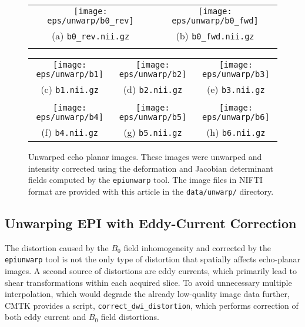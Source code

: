 \documentclass{InsightArticle}
\begin{document}
\begin{figure}[tbp]
\begin{center}
\begin{tabular}{cc}
\texttt{[image: eps/unwarp/b0\_rev]} &
\texttt{[image: eps/unwarp/b0\_fwd]} \\
(a) \texttt{b0\_rev.nii.gz} & (b)  \texttt{b0\_fwd.nii.gz}\\
\\
\end{tabular}
\begin{tabular}{ccc}
\texttt{[image: eps/unwarp/b1]} &
\texttt{[image: eps/unwarp/b2]} &
\texttt{[image: eps/unwarp/b3]} \\
(c) \texttt{b1.nii.gz} & (d) \texttt{b2.nii.gz} & (e) \texttt{b3.nii.gz} \\
\\
\texttt{[image: eps/unwarp/b4]} &
\texttt{[image: eps/unwarp/b5]} &
\texttt{[image: eps/unwarp/b6]} \\
(f) \texttt{b4.nii.gz} & (g) \texttt{b5.nii.gz} & (h) \texttt{b6.nii.gz} \\
\end{tabular}
\end{center}
\caption{Unwarped echo planar images. These images were unwarped and intensity
corrected using the deformation and Jacobian determinant fields computed by
the \texttt{epiunwarp} tool. The image files in NIFTI format are provided with
this article in the \texttt{data/unwarp/} directory.}
\label{fig:Unwarp}
\end{figure}

\subsection{Unwarping EPI with Eddy-Current Correction}

The distortion caused by the $B_0$ field inhomogeneity and corrected by the
\verb|epiunwarp| tool is not the only type of distortion that spatially
affects echo-planar images. A second source of distortions are eddy currents,
which primarily lead to shear transformations within each acquired slice. To
avoid unnecessary multiple interpolation, which would degrade the already
low-quality image data further, CMTK provides a script,
\verb|correct_dwi_distortion|, which performs correction of both eddy current
and $B_0$ field distortions.
\end{document}
